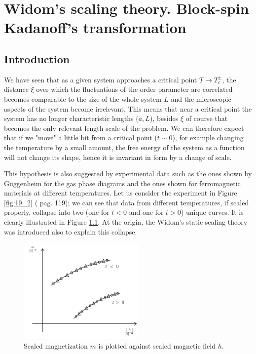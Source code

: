 \documentclass[../../Main/Main.tex]{subfiles}
\begin{document}
\chapter{Widom's scaling theory. Block-spin Kadanoff's transformation}

\section{Introduction}
We have seen  that as a given system approaches a critical point \( T \rightarrow T_c^{\pm} \), the distance \( \xi  \)  over which the fluctuations of the order parameter are correlated becomes comparable to the size of the whole system \( L \) and the microscopic aspects of the system become irrelevant. This means that near a critical point the system has no longer characteristic lengths (\( a,L \)), besides \( \xi  \) of course that becomes the only relevant length scale of the problem. We can therefore expect that if we "move" a little bit from a critical point (\( t \sim 0 \)), for example changing the temperature by a small amount, the free energy of the system as a function will not change its shape, hence it is invariant in form by a change of scale.

 This hypothesis is also suggested by experimental data such as the ones shown by Guggenheim for the gas phase diagrams and the ones shown for ferromagnetic materials at different temperatures. Let us consider the experiment in Figure \ref{fig:19_2} (\cite{3_lesson_3} pag. 119); we can see that data from different temperatures, if scaled properly, collapse into two (one for \( t<0 \) and one for \( t>0 \)) unique curves. It is clearly illustrated in Figure \ref{fig:19_1}. At the origin, the Widom's static scaling theory was introduced also to explain this collapse.

 \begin{figure}[h!]
 \centering
 \includegraphics[width=0.55\textwidth]{./img/1.pdf}
 \caption{\label{fig:19_1} Scaled magnetization \( m \) is plotted against scaled magnetic field \( h \).}
 \end{figure}
\end{document}
